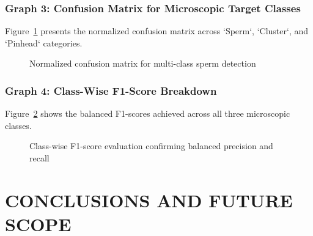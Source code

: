 \documentclass[12pt,a4paper]{report}
\begin{document}
\subsection{Graph 3: Confusion Matrix for Microscopic Target Classes}
Figure~\ref{fig:conf_mat} presents the normalized confusion matrix across `Sperm`, `Cluster`, and `Pinhead` categories.

\begin{figure}[htbp]
\centering
{}
\caption{Normalized confusion matrix for multi-class sperm detection}
\label{fig:conf_mat}
\end{figure}

\subsection{Graph 4: Class-Wise F1-Score Breakdown}
Figure~\ref{fig:f1_scores} shows the balanced F1-scores achieved across all three microscopic classes.

\begin{figure}[htbp]
\centering
{}
\caption{Class-wise F1-score evaluation confirming balanced precision and recall}
\label{fig:f1_scores}
\end{figure}

\chapter{CONCLUSIONS AND FUTURE SCOPE}
\end{document}
